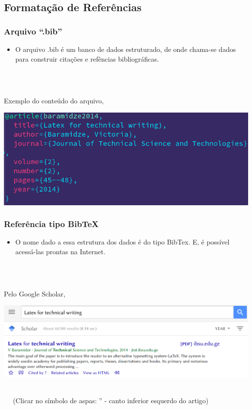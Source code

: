 \documentclass{beamer}
\begin{document}
	\begin{frame}
	 \section{Formatação de Referências}
	  \frametitle{Arquivo ``.bib''}

	  \begin{itemize}
	  \item O arquivo .bib é um banco de dados estruturado, de onde chama-se
	  dados para construir citações e refências bibliográficas.
	\end{itemize}

	\\~~

	Exemplo do conteúdo do arquivo,
	\begin{center}
	  \includegraphics[scale=0.40]{../Imagens/A2I101.png}
	\end{center}
	\end{frame}

	\begin{frame}
	  \frametitle{Referência tipo BibTeX}

	  \begin{itemize}
	  \item O nome dado a essa estrutura dos dados é do tipo BibTex. E, é
	    possível acessá-las prontas na Internet.
	\end{itemize}

	\\~~

	Pelo Google Scholar,
	\begin{center}
	  \includegraphics[scale=0.20]{../Imagens/A2I102.png}
	\end{center}
	\\~~
	(Clicar no símbolo de aspas: '' - canto inferior esquerdo do artigo)


	\end{frame}
\end{document}
